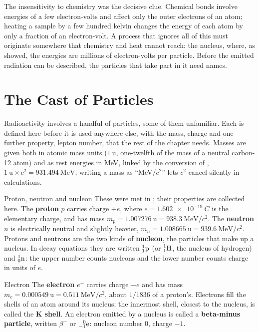 The insensitivity to chemistry was the decisive clue. Chemical bonds involve energies of a few
electron-volts and affect only the outer electrons of an atom; heating a sample by a few hundred kelvin
changes the energy of each atom by only a fraction of an electron-volt. A process that ignores all of
this must originate somewhere that chemistry and heat cannot reach: the nucleus, where, as
 showed, the energies are millions of electron-volts per particle. Before the emitted
radiation can be described, the particles that take part in it need names.

\section{The Cast of Particles}\label{sec:decay-particles}

Radioactivity involves a handful of particles, some of them unfamiliar. Each is defined here before it
is used anywhere else, with the mass, charge and one further property, lepton number, that the rest of
the chapter needs. Masses are given both in atomic mass units ($\SI{1}{\amu}$, one-twelfth of the mass of
a neutral carbon-12 atom) and as rest energies in MeV, linked by the conversion of ,
$\SI{1}{\amu}\times c^2=\SI{931.494}{\MeV}$; writing a mass as ``MeV$/c^2$'' lets $c^2$ cancel silently in
calculations.

\begin{defbox}{Proton, neutron and nucleon}
These were met in ; their properties are collected here. The \textbf{proton} $p$
carries charge $+e$, where $e=\SI{1.602e-19}{C}$ is the elementary charge, and has mass
$m_p=\SI{1.007276}{\amu}=\SI{938.3}{\MeV}/c^2$. The \textbf{neutron} $n$ is electrically neutral and
slightly heavier, $m_n=\SI{1.008665}{\amu}=\SI{939.6}{\MeV}/c^2$. Protons and neutrons are the two kinds of
\textbf{nucleon}, the particles that make up a nucleus. In decay equations they are written $\prescript{1}{1}{\mathrm{p}}$
(or $\prescript{1}{1}{\mathrm{H}}$, the nucleus of hydrogen) and $\prescript{1}{0}{\mathrm{n}}$: the upper number counts nucleons and the lower
number counts charge in units of $e$.
\end{defbox}

\begin{defbox}{Electron}
The \textbf{electron} $e^-$ carries charge $-e$ and has mass $m_e=\SI{0.000549}{\amu}=\SI{0.511}{\MeV}/c^2$,
about $1/1836$ of a proton's. Electrons fill the shells of an atom around its nucleus; the innermost
shell, closest to the nucleus, is called the \textbf{K shell}. An electron emitted by a nucleus is called a
\textbf{beta-minus particle}, written $\beta^-$ or $\prescript{0}{-1}{\mathrm{e}}$: nucleon number $0$, charge $-1$.
\end{defbox}

